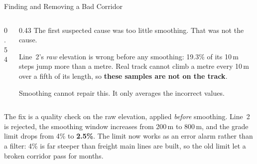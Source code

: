 \begin{frame}{Finding and Removing a Bad Corridor}
  \vspace{0.1em}
  \begin{columns}[T,onlytextwidth]
    \begin{column}{0.54\textwidth}
      \vspace{0.6em}
      \rawElevQAChart
    \end{column}
    \begin{column}{0.43\textwidth}
      \vspace{0.2em}
      \small
      The first suspected cause was too little smoothing. \alert{That was not
      the cause.}

      \vspace{0.6em}
      Line~2's \emph{raw} elevation is wrong before any smoothing: 19.3\% of its
      10\,m steps jump more than a metre. Real track cannot climb a metre every
      10\,m over a fifth of its length, so \textbf{these samples are not on the
      track}.

      \vspace{0.6em}
      Smoothing cannot repair this. It only averages the incorrect values.
    \end{column}
  \end{columns}

  \vspace{0.4em}
  \begin{minipage}{0.96\textwidth}\footnotesize
    The fix is a quality check on the raw elevation, applied \emph{before}
    smoothing. Line~2 is rejected, the smoothing window increases from 200\,m to
    800\,m, and the grade limit drops from 4\% to \textbf{2.5\%}. The limit now
    works as an error alarm rather than a filter: 4\% is far steeper than freight
    main lines are built, so the old limit let a broken corridor pass for months.
  \end{minipage}
\end{frame}

